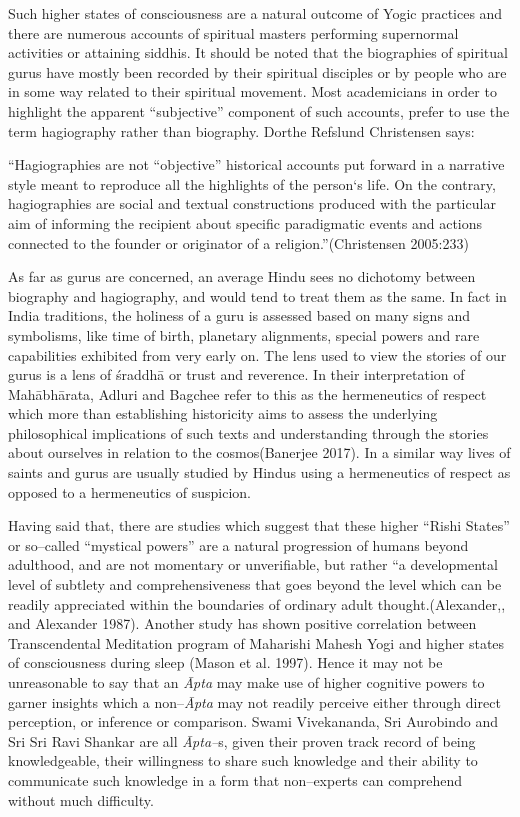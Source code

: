 Such higher states of consciousness are a natural outcome of Yogic practices and there are numerous accounts of spiritual masters performing supernormal activities or attaining siddhis. It should be noted that the biographies of spiritual gurus have mostly been recorded by their spiritual disciples or by people who are in some way related to their spiritual movement. Most academicians in order to highlight the apparent “subjective” component of such accounts, prefer to use the term hagiography rather than biography. Dorthe Refslund Christensen says:

\begin{myquote}
“Hagiographies are not “objective” historical accounts put forward in a narrative style meant to reproduce all the highlights of the person‘s life. On the contrary, hagiographies are social and textual constructions produced with the particular aim of informing the recipient about specific paradigmatic events and actions connected to the founder or originator of a religion.”(Christensen 2005:233)
\end{myquote}

\newpage

As far as gurus are concerned, an average Hindu sees no dichotomy between biography and hagiography, and would tend to treat them as the same. In fact in India traditions, the holiness of a guru is assessed based on many signs and symbolisms, like time of birth, planetary alignments, special powers and rare capabilities exhibited from very early on. The lens used to view the stories of our gurus is a lens of śraddhā or trust and reverence. In their interpretation of Mahābhārata, Adluri and Bagchee refer to this as the hermeneutics of respect which more than establishing historicity aims to assess the underlying philosophical implications of such texts and understanding through the stories about ourselves in relation to the cosmos(Banerjee 2017). In a similar way lives of saints and gurus are usually studied by Hindus using a hermeneutics of respect as opposed to a hermeneutics of suspicion.

Having said that, there are studies which suggest that these higher “Rishi States” or so–called “mystical powers” are a natural progression of humans beyond adulthood, and are not momentary or unverifiable, but rather “a developmental level of subtlety and comprehensiveness that goes beyond the level which can be readily appreciated within the boundaries of ordinary adult thought.(Alexander,, and Alexander 1987). Another study has shown positive correlation between Transcendental Meditation program of Maharishi Mahesh Yogi and higher states of consciousness during sleep (Mason et al. 1997). Hence it may not be unreasonable to say that an \textit{Āpta} may make use of higher cognitive powers to garner insights which a non–\textit{Āpta} may not readily perceive either through direct perception, or inference or comparison. Swami Vivekananda, Sri Aurobindo and Sri Sri Ravi Shankar are all \textit{Āpta–}s, given their proven track record of being knowledgeable, their willingness to share such knowledge and their ability to communicate such knowledge in a form that non–experts can comprehend without much difficulty.


